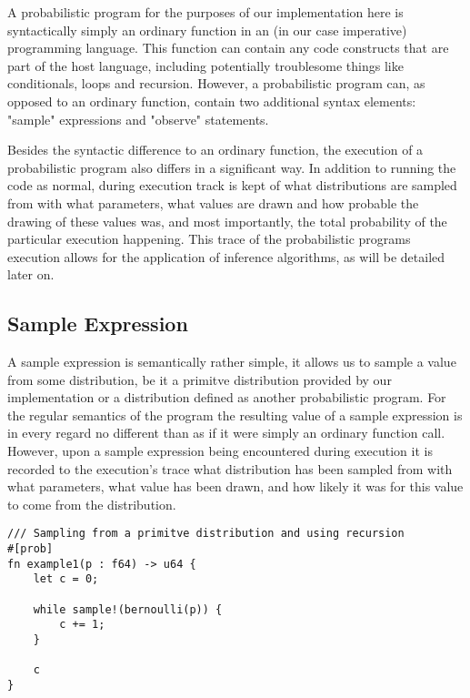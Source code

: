 A probabilistic program for the purposes of our implementation here is syntactically simply an ordinary function in an (in our case imperative) programming language. This function can contain any code constructs that are part of the host language, including potentially troublesome things like conditionals, loops and recursion. However, a probabilistic program can, as opposed to an ordinary function, contain two additional syntax elements: "sample" expressions and "observe" statements.

Besides the syntactic difference to an ordinary function, the execution of a probabilistic program also differs in a significant way. In addition to running the code as normal, during execution track is kept of what distributions are sampled from with what parameters, what values are drawn and how probable the drawing of these values was, and most importantly, the total probability of the particular execution happening. This trace of the probabilistic programs execution allows for the application of inference algorithms, as will be detailed later on.

\subsection{Sample Expression}

A sample expression is semantically rather simple, it allows us to sample a value from some distribution, be it a primitve distribution provided by our implementation or a distribution defined as another probabilistic program. For the regular semantics of the program the resulting value of a sample expression is in every regard no different than as if it were simply an ordinary function call. However, upon a sample expression being encountered during execution it is recorded to the execution's trace what distribution has been sampled from with what parameters, what value has been drawn, and how likely it was for this value to come from the distribution.

\begin{minipage}{\linewidth}
\begin{lstlisting}
/// Sampling from a primitve distribution and using recursion
#[prob]
fn example1(p : f64) -> u64 {
    let c = 0;

    while sample!(bernoulli(p)) {
        c += 1;
    }

    c
}
\end{lstlisting}
\end{minipage}

